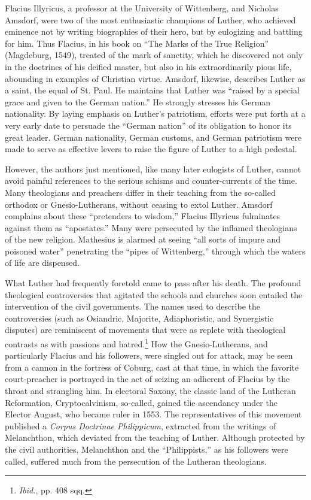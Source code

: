 Flacius Illyricus, a professor at the University of Wittenberg, and
Nicholas Amsdorf, were two of the most enthusiastic champions of
Luther, who achieved eminence not by writing biographies of their
hero, but by eulogizing and battling for him. Thus Flacius, in his
book on “The Marks of the True Religion” (Magdeburg, 1549),
treated of the mark of sanctity, which he discovered not only in the
doctrines of his deified master, but also in his extraordinarily pious
life, abounding in examples of Christian virtue. Amsdorf, likewise, describes
Luther as a saint, the equal of St. Paul. He maintains
that Luther was “raised by a special grace and given to the German
nation.” He strongly stresses his German nationality. By laying emphasis
on Luther’s patriotism, efforts were put forth at a very early
date to persuade the “German nation” of its obligation to honor its
great leader. German nationality, German customs, and German patriotism
were made to serve as effective levers to raise the figure of
Luther to a high pedestal.

However, the authors just mentioned, like many later eulogists of
Luther, cannot avoid painful references to the serious schisms and
counter-currents of the time. Many theologians and preachers differ
in their teaching from the so-called orthodox or Gnesio-Lutherans,
without ceasing to extol Luther. Amsdorf complains about these
“pretenders to wisdom,” Flacius Illyricus fulminates against them as
“apostates.” Many were persecuted by the inflamed theologians of
the new religion. Mathesius is alarmed at seeing “all sorts of impure
and poisoned water” penetrating the “pipes of Wittenberg,” through
which the waters of life are dispensed.

What Luther had frequently foretold came to pass after his death.
The profound theological controversies that agitated the schools and
churches soon entailed the intervention of the civil governments.
The names used to describe the controversies (such as Osiandric,
Majorite, Adiaphoristic, and Synergistic disputes) are reminiscent of
movements that were as replete with theological contrasts as with
passions and hatred.\footnote{\textit{Ibid.}, pp. 408 sqq.}
How the Gnesio-Lutherans, and particularly
Flacius and his followers, were singled out for attack, may be seen
from a cannon in the fortress of Coburg, cast at that time, in which
the favorite court-preacher is portrayed in the act of seizing an adherent
of Flacius by the throat and strangling him. In electoral Saxony, the
classic land of the Lutheran Reformation, Cryptocalvinism,
so-called, gained tlie ascendancy under the Elector August, who became
ruler in 1553. The representatives of this movement published
a \textit{Corpus Doctrinae Philippicum}, extracted from the writings of Melanchthon,
which deviated from the teaching of Luther. Although
protected by the civil authorities, Melanchthon and the “Philippists,”
as his followers were called, suffered much from the persecution of the
Lutheran theologians.

